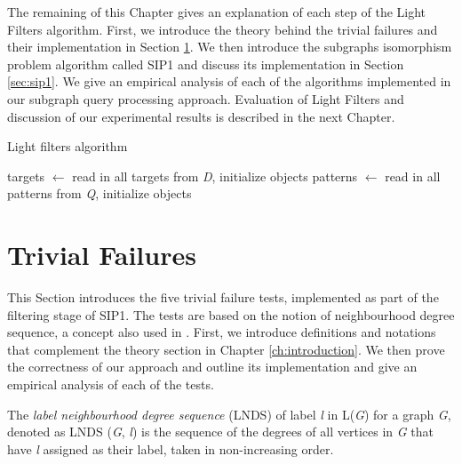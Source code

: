 \documentclass{l4proj}
\begin{document}
The remaining of this Chapter gives an explanation of each step of the Light Filters algorithm. First, we introduce the theory behind the trivial failures and their implementation in Section \ref{sec:trivialFails}. We then introduce the subgraphs isomorphism problem algorithm called SIP1 and discuss its implementation in Section \ref{sec:sip1}. We give an empirical analysis of each of the algorithms implemented in our subgraph query processing approach. Evaluation of Light Filters and discussion of our experimental results is described in the next Chapter.

\begin{algorithm}
\centering
\caption{Light filters algorithm}
\label{algo:roughSIP}
\begin{algorithmic}[1]
\State targets $\gets$ read in all targets from \emph{D}, initialize objects
\State patterns $\gets$ read in all patterns from \emph{Q}, initialize objects
		 
    	\EndIf
    \EndFor
\EndFor
\EndProcedure
\end{algorithmic}
\end{algorithm}

\section{Trivial Failures}
\label{sec:trivialFails}

This Section introduces the five trivial failure tests, implemented as part of the filtering stage of SIP1. The tests are based on the notion of neighbourhood degree sequence, a concept also used in \cite{Solnon:2010}. First, we introduce definitions and notations that complement the theory section in Chapter \ref{ch:introduction}. We then prove the correctness of our approach and outline its implementation and give an empirical analysis of each of the tests.

The \emph{label neighbourhood degree sequence} (LNDS) of label \emph{l} in L(\emph{G}) for a graph \emph{G}, denoted as LNDS (\emph{G}, \emph{l}) is the sequence of the degrees of all vertices in \emph{G} that have \emph{l} assigned as their label, taken in non-increasing order.

\end{document}
